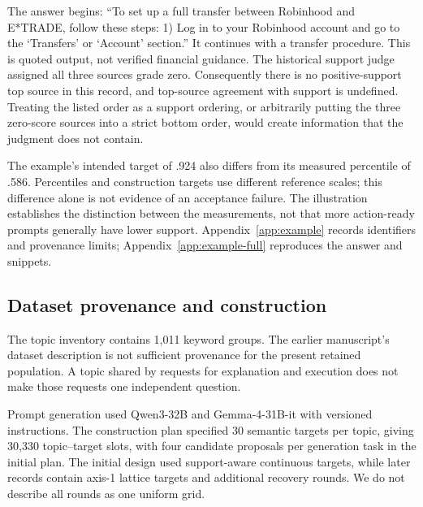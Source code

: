 The answer begins: ``To set up a full transfer between Robinhood and E*TRADE, follow these steps: 1) Log in to your Robinhood account and go to the `Transfers' or `Account' section.'' It continues with a transfer procedure. This is quoted output, not verified financial guidance. The historical support judge assigned all three sources grade zero. Consequently there is no positive-support top source in this record, and top-source agreement with support is undefined. Treating the listed order as a support ordering, or arbitrarily putting the three zero-score sources into a strict bottom order, would create information that the judgment does not contain.

The example's intended target of .924 also differs from its measured percentile of .586. Percentiles and construction targets use different reference scales; this difference alone is not evidence of an acceptance failure. The illustration establishes the distinction between the measurements, not that more action-ready prompts generally have lower support. Appendix~\ref{app:example} records identifiers and provenance limits; Appendix~\ref{app:example-full} reproduces the answer and snippets. 

\subsection{Dataset provenance and construction}
\label{sec:population}
The topic inventory contains 1,011 keyword groups.  The earlier manuscript's dataset description is not sufficient provenance for the present retained population. A topic shared by requests for explanation and execution does not make those requests one independent question.

Prompt generation used Qwen3-32B and Gemma-4-31B-it with versioned instructions. The construction plan specified 30 semantic targets per topic, giving 30,330 topic--target slots, with four candidate proposals per generation task in the initial plan. The initial design used support-aware continuous targets, while later records contain axis-1 lattice targets and additional recovery rounds. We do not describe all rounds as one uniform grid. 

